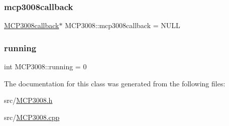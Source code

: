 \subsubsection{\texorpdfstring{mcp3008callback}{mcp3008callback}}
{\footnotesize\ttfamily \hyperlink{classMCP3008callback}{M\+C\+P3008callback}$\ast$ M\+C\+P3008\+::mcp3008callback = N\+U\+LL\hspace{0.3cm}{\ttfamily [private]}}

\mbox{\label{classMCP3008_a81354e1933a79bcb9f1d01c0e16566f0}} 
\subsubsection{\texorpdfstring{running}{running}}
{\footnotesize\ttfamily int M\+C\+P3008\+::running = 0\hspace{0.3cm}{\ttfamily [private]}}



The documentation for this class was generated from the following files\+:\begin{DoxyCompactItemize}
\item 
src/\hyperlink{MCP3008_8h}{M\+C\+P3008.\+h}\item 
src/\hyperlink{MCP3008_8cpp}{M\+C\+P3008.\+cpp}\end{DoxyCompactItemize}
